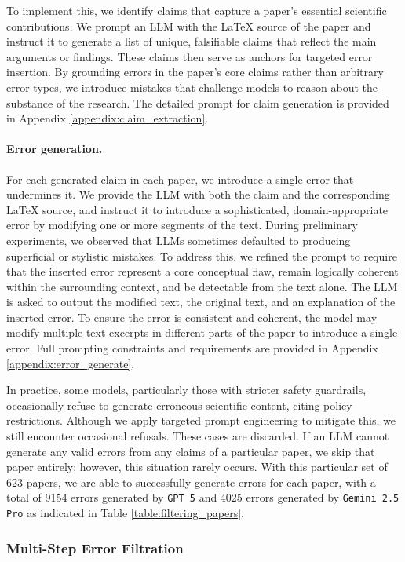 \documentclass{article}
\newcommand{\gemini}{\texttt{Gemini 2.5 Pro}}
\newcommand{\gpt}{\texttt{GPT 5}}
\begin{document}
To implement this, we identify claims that capture a paper's essential scientific contributions. We prompt an LLM with the LaTeX source of the paper and instruct it to generate a list of unique, falsifiable claims that reflect the main arguments or findings. These claims then serve as anchors for targeted error insertion. By grounding errors in the paper's core claims rather than arbitrary error types, we introduce mistakes that challenge models to reason about the substance of the research. The detailed prompt for claim generation is provided in Appendix \ref{appendix:claim_extraction}. 

\paragraph{Error generation.} For each generated claim in each paper, we introduce a single error that undermines it. We provide the LLM with both the claim and the corresponding LaTeX source, and instruct it to introduce a sophisticated, domain-appropriate error by modifying one or more segments of the text. During preliminary experiments, we observed that LLMs sometimes defaulted to producing superficial or stylistic mistakes. To address this, we refined the prompt to require that the inserted error represent a core conceptual flaw, remain logically coherent within the surrounding context, and be detectable from the text alone. The LLM is asked to output the modified text, the original text, and an explanation of the inserted error. To ensure the error is consistent and coherent, the model may modify multiple text excerpts in different parts of the paper to introduce a single error. Full prompting constraints and requirements are provided in Appendix \ref{appendix:error_generate}.

In practice, some models, particularly those with stricter safety guardrails, occasionally refuse to generate erroneous scientific content, citing policy restrictions. Although we apply targeted prompt engineering to mitigate this, we still encounter occasional refusals. These cases are discarded. If an LLM cannot generate any valid errors from any claims of a particular paper, we skip that paper entirely; however, this situation rarely occurs. With this particular set of 623 papers, we are able to successfully generate errors for each paper, with a total of 9154 errors generated by \gpt{} and 4025 errors generated by \gemini{} as indicated in Table \ref{table:filtering_papers}. 

\subsubsection{Multi-Step Error Filtration}
\label{section:multi_step_filtration}
\end{document}

